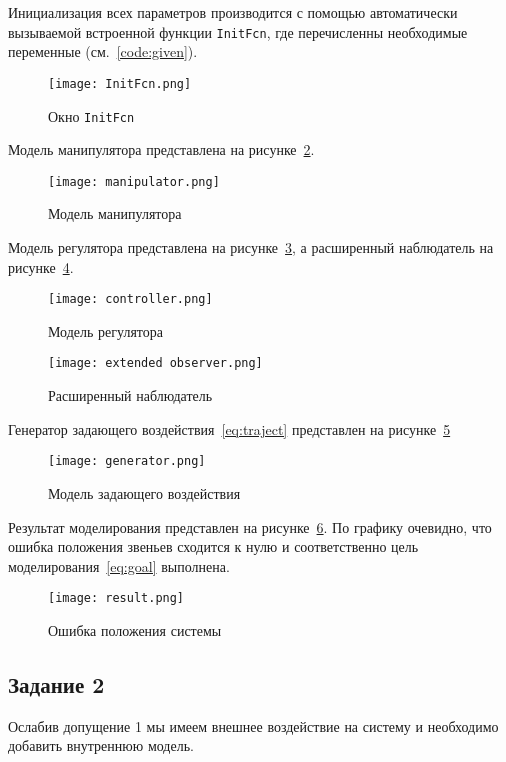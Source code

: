\documentclass[14pt]{extarticle}
\begin{document}
    Инициализация всех параметров производится с помощью автоматически вызываемой встроенной функции \texttt{InitFcn},
    где перечисленны необходимые переменные (см.~\ref{code:given}).
    \begin{figure}[H]
        \centering
        \texttt{[image: InitFcn.png]}
        \caption{Окно \texttt{InitFcn}}
        \label{pic:InitFcn}
    \end{figure}

    \sloppy Модель манипулятора представлена на рисунке~\ref{pic:manipulator}.
    \begin{figure}[H]
        \centering
        \texttt{[image: manipulator.png]}
        \caption{Модель манипулятора}
        \label{pic:manipulator}
    \end{figure}

    Модель регулятора представлена на рисунке~\ref{pic:controller}, а расширенный наблюдатель на
    рисунке~\ref{pic:extended observer}.
    \begin{figure}[H]
        \centering
        \texttt{[image: controller.png]}
        \caption{Модель регулятора}
        \label{pic:controller}
    \end{figure}

    \begin{figure}[H]
        \centering
        \texttt{[image: extended observer.png]}
        \caption{Расширенный наблюдатель}
        \label{pic:extended observer}
    \end{figure}

    Генератор задающего воздействия~\eqref{eq:traject} представлен на рисунке~\ref{pic:generator}
    \begin{figure}[H]
        \centering
        \texttt{[image: generator.png]}
        \caption{Модель задающего воздействия}
        \label{pic:generator}
    \end{figure}

    Результат моделирования представлен на рисунке~\ref{pic:result}. По графику очевидно, что ошибка
    положения звеньев сходится к нулю и соответственно цель моделирования~\eqref{eq:goal} выполнена.
    \begin{figure}[H]
        \centering
        \texttt{[image: result.png]}
        \caption{Ошибка положения системы}
        \label{pic:result}
    \end{figure}

    \subsection*{Задание 2}
    Ослабив допущение 1 мы имеем внешнее воздействие на систему и необходимо добавить внутреннюю
    модель.
\end{document}
